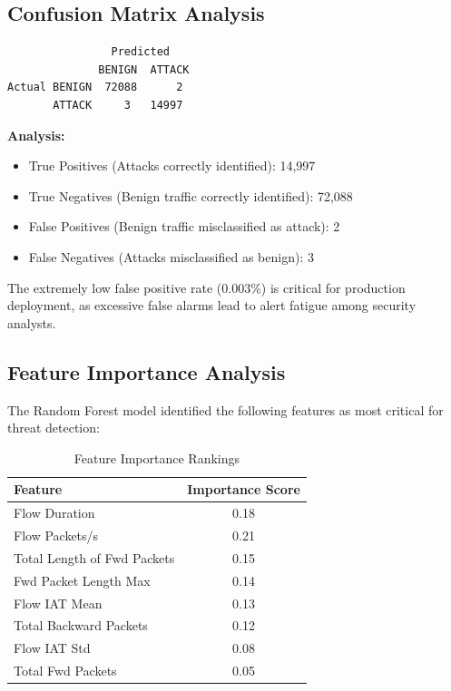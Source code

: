 \documentclass[12pt,a4paper]{article}
\begin{document}
\subsection{Confusion Matrix Analysis}

\begin{verbatim}
                Predicted
              BENIGN  ATTACK
Actual BENIGN  72088      2
       ATTACK     3   14997
\end{verbatim}

\textbf{Analysis:}
\begin{itemize}
    \item True Positives (Attacks correctly identified): 14,997
    \item True Negatives (Benign traffic correctly identified): 72,088
    \item False Positives (Benign traffic misclassified as attack): 2
    \item False Negatives (Attacks misclassified as benign): 3
\end{itemize}

The extremely low false positive rate (0.003\%) is critical for production deployment, as excessive false alarms lead to alert fatigue among security analysts.

\subsection{Feature Importance Analysis}

The Random Forest model identified the following features as most critical for threat detection:

\begin{table}[H]
\centering
\begin{tabular}{|l|c|}
\hline
\textbf{Feature} & \textbf{Importance Score} \\
\hline
Flow Duration & 0.18 \\
Flow Packets/s & 0.21 \\
Total Length of Fwd Packets & 0.15 \\
Fwd Packet Length Max & 0.14 \\
Flow IAT Mean & 0.13 \\
Total Backward Packets & 0.12 \\
Flow IAT Std & 0.08 \\
Total Fwd Packets & 0.05 \\
\hline
\end{tabular}
\caption{Feature Importance Rankings}
\end{table}
\end{document}
